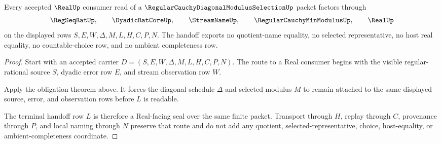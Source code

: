 \begin{theorem}
\label{thm:regular-cauchy-diagonal-modulus-real-handoff}
Every accepted $\RealUp$ consumer read of a $\RegularCauchyDiagonalModulusSelectionUp$ packet factors through
$$
\RegSeqRatUp,\qquad
\DyadicRatCoreUp,\qquad
\StreamNameUp,\qquad
\RegularCauchyMinModulusUp,\qquad
\RealUp
$$
on the displayed rows $S,E,W,\Delta,M,L,H,C,P,N$. The handoff exports no quotient-name equality, no selected representative, no host real equality, no countable-choice row, and no ambient completeness row.
\end{theorem}
\begin{proof}
Start with an accepted carrier $D=(S,E,W,\Delta,M,L,H,C,P,N)$. The route to a Real consumer begins with the visible regular-rational source $S$, dyadic error row $E$, and stream observation row $W$.

Apply the obligation theorem above. It forces the diagonal schedule $\Delta$ and selected modulus $M$ to remain attached to the same displayed source, error, and observation rows before $L$ is readable.

The terminal handoff row $L$ is therefore a Real-facing seal over the same finite packet. Transport through $H$, replay through $C$, provenance through $P$, and local naming through $N$ preserve that route and do not add any quotient, selected-representative, choice, host-equality, or ambient-completeness coordinate.
\end{proof}




